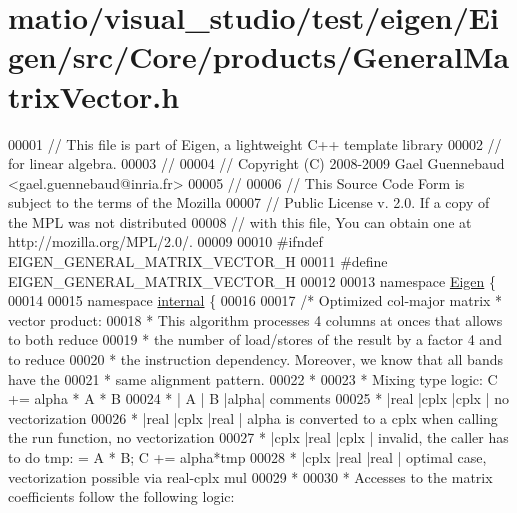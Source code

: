 \hypertarget{matio_2visual__studio_2test_2eigen_2_eigen_2src_2_core_2products_2_general_matrix_vector_8h_source}{}\section{matio/visual\+\_\+studio/test/eigen/\+Eigen/src/\+Core/products/\+General\+Matrix\+Vector.h}
\label{matio_2visual__studio_2test_2eigen_2_eigen_2src_2_core_2products_2_general_matrix_vector_8h_source}

\begin{DoxyCode}
00001 \textcolor{comment}{// This file is part of Eigen, a lightweight C++ template library}
00002 \textcolor{comment}{// for linear algebra.}
00003 \textcolor{comment}{//}
00004 \textcolor{comment}{// Copyright (C) 2008-2009 Gael Guennebaud <gael.guennebaud@inria.fr>}
00005 \textcolor{comment}{//}
00006 \textcolor{comment}{// This Source Code Form is subject to the terms of the Mozilla}
00007 \textcolor{comment}{// Public License v. 2.0. If a copy of the MPL was not distributed}
00008 \textcolor{comment}{// with this file, You can obtain one at http://mozilla.org/MPL/2.0/.}
00009 
00010 \textcolor{preprocessor}{#ifndef EIGEN\_GENERAL\_MATRIX\_VECTOR\_H}
00011 \textcolor{preprocessor}{#define EIGEN\_GENERAL\_MATRIX\_VECTOR\_H}
00012 
00013 \textcolor{keyword}{namespace }\hyperlink{namespace_eigen}{Eigen} \{
00014 
00015 \textcolor{keyword}{namespace }\hyperlink{namespaceinternal}{internal} \{
00016 
00017 \textcolor{comment}{/* Optimized col-major matrix * vector product:}
00018 \textcolor{comment}{ * This algorithm processes 4 columns at onces that allows to both reduce}
00019 \textcolor{comment}{ * the number of load/stores of the result by a factor 4 and to reduce}
00020 \textcolor{comment}{ * the instruction dependency. Moreover, we know that all bands have the}
00021 \textcolor{comment}{ * same alignment pattern.}
00022 \textcolor{comment}{ *}
00023 \textcolor{comment}{ * Mixing type logic: C += alpha * A * B}
00024 \textcolor{comment}{ *  |  A  |  B  |alpha| comments}
00025 \textcolor{comment}{ *  |real |cplx |cplx | no vectorization}
00026 \textcolor{comment}{ *  |real |cplx |real | alpha is converted to a cplx when calling the run function, no vectorization}
00027 \textcolor{comment}{ *  |cplx |real |cplx | invalid, the caller has to do tmp: = A * B; C += alpha*tmp}
00028 \textcolor{comment}{ *  |cplx |real |real | optimal case, vectorization possible via real-cplx mul}
00029 \textcolor{comment}{ *}
00030 \textcolor{comment}{ * Accesses to the matrix coefficients follow the following logic:}

\end{DoxyCode}
